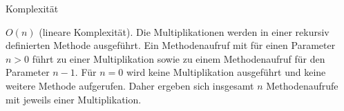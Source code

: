 \begin{exercise}{Komplexität}
\begin{solution}
\begin{parts}
\item
$O(n)$ (lineare Komplexität). Die Multiplikationen werden in einer rekursiv definierten Methode ausgeführt. Ein Methodenaufruf mit für einen Parameter $n > 0$ führt zu einer Multiplikation sowie zu einem Methodenaufruf für den Parameter $n-1$. Für $n = 0$ wird keine Multiplikation ausgeführt und keine weitere Methode aufgerufen. Daher ergeben sich insgesamt $n$ Methodenaufrufe mit jeweils einer Multiplikation.
\end{parts}
\end{solution}
\end{exercise}